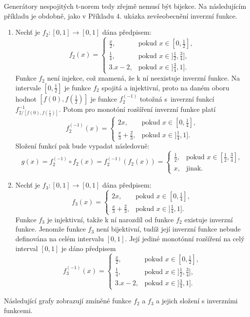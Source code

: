 Generátory nespojitých t-norem tedy zřejmě nemusí být bijekce. Na následujícím příkladu je obdobně, jako v Příkladu 4. ukázka zevšeobecnění inverzní funkce.
\begin{example}
\cite{hlinena}
\begin{enumerate}
    \item Nech\v t je $f_2:[0,1] \rightarrow [0,1]$ dána předpisem:
    $$f_2(x)= \begin{cases} \frac x2, & \mbox {pokud $x \in [0,\frac 12],$}
    \\ \frac 14, & \mbox {pokud $x \in ]\frac 12,\frac 34],$}
    \\ 3.x-2, & \mbox {pokud $x \in ]\frac 34,1]$.}
    \end{cases}$$
    Funkce $f_2$ není injekce, což znamená, že k ní neexistuje inverzní funkce. Na intervale $[0,\frac 12]$ je funkce $f_2$ spojitá a injektivní, proto na daném oboru hodnot $[f(0),f(\frac 12)]$ je
    funkce $f_2^{(-1)}$ totožná s~inverzní funkcí
    $f_{2/[f(0),f(\frac 12)]}^{-1}.$
    Potom pro monot\'oní rozšíření inverzní funkce plat\'i
    $$f_2^{(-1)}(x)= \begin{cases} 2x, & \mbox {pokud $x \in [0,\frac 14],$}
    \\ \frac x3 + \frac 23, & \mbox {pokud $x \in ]\frac 14,1].$}
    \end{cases}$$
    Složení funkcí pak bude vypadat následovně:
    $$g(x)=f_2^{(-1)} \circ f_2(x)=f_2^{(-1)} \left(f_2(x)\right)= \begin{cases} \frac 12,
    & \mbox{pokud $x \in [\frac 12,\frac 34],$}
    \\x, & \mbox {jinak.} \end{cases}$$
    
    \item Nech\v t je $f_3:[0,1] \rightarrow [0,1]$ dána předpisem:
    $$f_3(x)= \begin{cases} 2x, & \mbox {pokud $x \in [0,\frac 14],$}
    \\ \frac x3 + \frac 23, & \mbox {pokud $x \in ]\frac 14,1].$}
    \end{cases}$$
    Funkce $f_3$ je injektivní, takže k ní narozdíl od funkce $f_2$ existuje inverzní funkce. Jenomže funkce $f_3$ není bijektivní, tudíž její inverzní funkce nebude definována na celém intervalu $[0,1]$. 
    Její jediné monot\' onní rozšíření na celý interval $[0,1]$ je dáno předpisem
    $$f_3^{(-1)}(x)= \begin{cases} \frac x2, & \mbox {pokud $x \in [0,\frac 12],$}
    \\ \frac 14, & \mbox {pokud $x \in ]\frac 12,\frac 34],$}
    \\ 3.x-2, & \mbox {pokud $x \in ]\frac 34,1]$.}
    \end{cases}$$
\end{enumerate}
\end{example}
Následující grafy zobrazují zmíněné funkce $f_2$ a $f_3$ a jejich složení s inverzními funkcemi.

